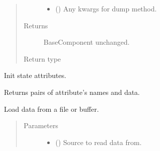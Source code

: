 \documentclass[letterpaper,10pt,english]{sphinxmanual}
\begin{document}
\begin{fulllineitems}
\begin{fulllineitems}
\begin{quote}
\begin{description}
\begin{itemize}
\item {} 
 (\sphinxstyleliteralemphasis{\sphinxupquote{, }}) \textendash{} Any kwargs for dump method.

\end{itemize}

\item[{Returns}] \leavevmode
{} \textendash{} BaseComponent unchanged.

\item[{Return type}] \leavevmode
{\hyperref[\detokenize{api/base_classes:geology.src.base_component.BaseComponent}]{}}

\end{description}\end{quote}

\end{fulllineitems}


\begin{fulllineitems}
\label{\detokenize{api/tables:geology.src.Tables.init_state}}
Init state attributes.

\end{fulllineitems}


\begin{fulllineitems}
\label{\detokenize{api/tables:geology.src.Tables.items}}
Returns pairs of attribute’s names and data.

\end{fulllineitems}


\begin{fulllineitems}
\label{\detokenize{api/tables:geology.src.Tables.load}}
Load data from a file or buffer.
\begin{quote}\begin{description}
\item[{Parameters}] \leavevmode\begin{itemize}
\item {} 
 () \textendash{} Source to read data from.


\end{itemize}
\end{description}
\end{quote}
\end{fulllineitems}
\end{fulllineitems}
\end{document}
